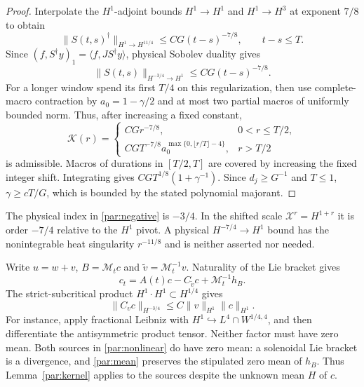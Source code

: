 \documentclass[11pt,a4paper]{amsart}
\theoremstyle{definition}
\theoremstyle{remark}
\numberwithin{equation}{section}
\begin{document}
\begin{proof}
Interpolate the $H^1$-adjoint bounds $H^1\to H^1$ and $H^1\to H^3$
at exponent $7/8$ to obtain
\[
 \|S(t,s)^\dagger\|_{H^1\to H^{11/4}}
 \le CG(t-s)^{-7/8},\qquad t-s\le T.
\]
Since $(f,S^\dagger y)_1=\langle f,JS^\dagger y\rangle$, physical
Sobolev duality gives
\begin{equation}\label{par:negative}
 \|S(t,s)\|_{H^{-3/4}\to H^1}\le CG(t-s)^{-7/8}.
\end{equation}
For a longer window spend its first $T/4$ on this regularization, then use
complete-macro contraction by $a_0=1-\gamma/2$ and at most two partial
macros of uniformly bounded norm. Thus, after increasing a fixed constant,
\[
 \mathcal K(r)=
 \begin{cases}
 CG r^{-7/8},&0<r\le T/2,\\
 CG T^{-7/8}a_0^{\max\{0,\lfloor r/T\rfloor-4\}},&r>T/2
 \end{cases}
\]
is admissible. Macros of durations in $[T/2,T]$ are covered by increasing
the fixed integer shift. Integrating gives
$CGT^{1/8}(1+\gamma^{-1})$. Since $d_j\ge G^{-1}$ and $T\le1$,
$\gamma\ge cT/G$, which is bounded by the stated polynomial majorant.
\end{proof}

The physical index in \eqref{par:negative} is $-3/4$. In the shifted scale
$\mathscr X^r=H^{1+r}$ it is order $-7/4$ relative to the $H^1$ pivot.
A physical $H^{-7/4}\to H^1$ bound has the nonintegrable heat singularity
$r^{-11/8}$ and is neither asserted nor needed.

Write $u=w+v$, $B=\mathcal M_tc$ and
$\widetilde v=\mathcal M_t^{-1}v$. Naturality of the Lie bracket gives
\begin{equation}\label{par:nonlinear}
 c_t=A(t)c-C_{\widetilde v}c+\mathcal M_t^{-1}h_B.
\end{equation}
The strict-subcritical product $H^1\cdot H^1\subset H^{1/4}$ gives
\begin{equation}\label{par:bracket}
 \|C_vc\|_{H^{-3/4}}\le C\|v\|_{H^1}\|c\|_{H^1}.
\end{equation}
For instance, apply fractional Leibniz with
$H^1\hookrightarrow L^4\cap W^{1/4,4}$, and then differentiate the
antisymmetric product tensor. Neither factor must have zero mean.
Both sources in \eqref{par:nonlinear} do have zero mean: a solenoidal Lie
bracket is a divergence, and \eqref{par:mean} preserves the stipulated zero
mean of $h_B$. Thus Lemma~\ref{par:kernel} applies to the sources despite
the unknown mean $H$ of $c$.
\end{document}
